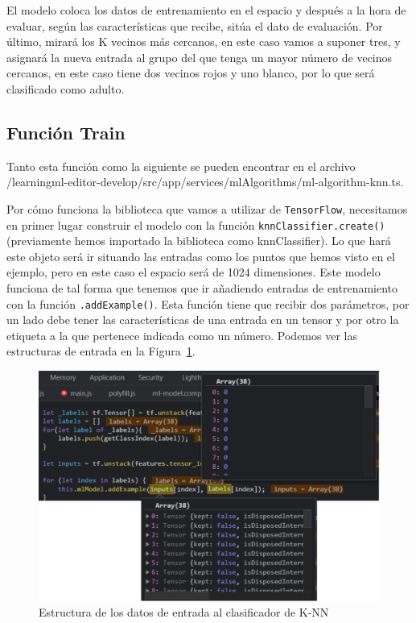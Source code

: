 \documentclass[a4paper, 12pt]{book}
\begin{document}
El modelo coloca los datos de entrenamiento en el espacio y después a la hora de evaluar, según las características que recibe, sitúa el dato de evaluación. Por último, mirará los K vecinos más cercanos, en este caso vamos a suponer tres, y asignará la nueva entrada al grupo del que tenga un mayor número de vecinos cercanos, en este caso tiene dos vecinos rojos y uno blanco, por lo que será clasificado como adulto.

\subsection{Función Train} 
\label{sec:funciontrainknn}

Tanto esta función como la siguiente se pueden encontrar en el archivo /learningml-editor-develop/src/app/services/mlAlgorithms/ml-algorithm-knn.ts.

Por cómo funciona la biblioteca que vamos a utilizar de \texttt{TensorFlow}, necesitamos en primer lugar construir el modelo con la función \texttt{knnClassifier.create()} (previamente hemos importado la biblioteca como knnClassifier). Lo que hará este objeto será ir situando las entradas como los puntos que hemos visto en el ejemplo, pero en este caso el espacio será de 1024 dimensiones. Este modelo funciona de tal forma que tenemos que ir añadiendo entradas de entrenamiento con la función \texttt{.addExample()}. Esta función tiene que recibir dos parámetros, por un lado debe tener las características de una entrada en un tensor y por otro la etiqueta a la que pertenece indicada como un número. Podemos ver las estructuras de entrada en la Figura~\ref{fig:entradasclasificadorknn}.

\begin{figure}
	\centering
	\includegraphics[width=12cm, keepaspectratio]{img/entradasclasificadorknn}
	\caption{Estructura de los datos de entrada al clasificador de K-NN}				
	\label{fig:entradasclasificadorknn}
\end{figure}
\end{document}
